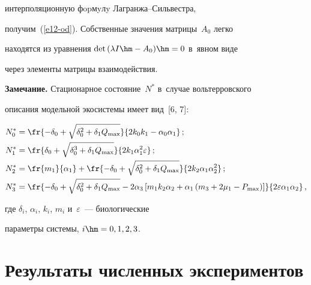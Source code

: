 интерполяционную фopмyлy Ла\-гран\-жа--Силь\-вест\-ра,  


получим~(\ref{e12-od}). Собственные значения матрицы~$A_0$ легко 


находятся из уравнения $\mathrm{det}\,(\lambda I\hm- A_0)\hm=0$ в~явном виде 


через элементы матрицы взаимодействия.





\smallskip





\noindent


\textbf{Замечание.} Стационарное состояние~$N^*$ в~случае вольтерровского 


описания модельной экосистемы имеет вид~[6, 7]:


\begin{align*}


N_0^*&=\fr{-\delta_0 +\sqrt{\delta_0^2+\delta_1Q_{\max}}}{2k_0k_1-


\alpha_0\alpha_1}\,;\\ 


N_1^*&=\fr{\delta_0+\sqrt{\delta_0^3+\delta_1Q_{\max}}}{2k_1\alpha_1^2\varepsilon}\,;\\


N_2^*&= \fr{m_1}{\alpha_1} +\fr{-\delta_0 


+\sqrt{\delta_0^2+\delta_1Q_{\max}}}{2k_2\alpha_1\alpha_2^2}\,;\\


N_3^*&= \fr{ -\delta_0 +\sqrt{\delta_0^2+\delta_1 Q_{\max}}-2\alpha_3\left[ 


m_1k_2\alpha_2+\alpha_1\left( m_3+2\mu_1-P_{\max}\right)\right]}{2\varepsilon 


\alpha_1\alpha_2}\,,


\end{align*}


где $\delta_i$, $\alpha_i$, $k_i$, $m_i$ и~$\varepsilon$~--- биологические 


параметры системы, $i\hm= 0,1,2,3$.








\section{Результаты численных экспериментов }





